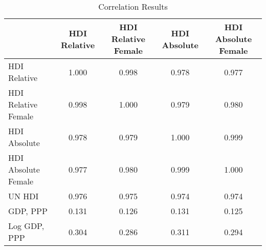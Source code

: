\begin{table}[H]
    \footnotesize
\caption{Correlation Results}
\begin{tabular}{lcccc}
\toprule
 & HDI Relative & HDI Relative Female & HDI Absolute & HDI Absolute Female \\
\midrule
HDI Relative & 1.000 & 0.998 & 0.978 & 0.977 \\
HDI Relative Female & 0.998 & 1.000 & 0.979 & 0.980 \\
HDI Absolute & 0.978 & 0.979 & 1.000 & 0.999 \\
HDI Absolute Female & 0.977 & 0.980 & 0.999 & 1.000 \\
UN HDI & 0.976 & 0.975 & 0.974 & 0.974 \\
GDP, PPP & 0.131 & 0.126 & 0.131 & 0.125 \\
Log GDP, PPP & 0.304 & 0.286 & 0.311 & 0.294 \\
\bottomrule
\end{tabular}
\end{table}
